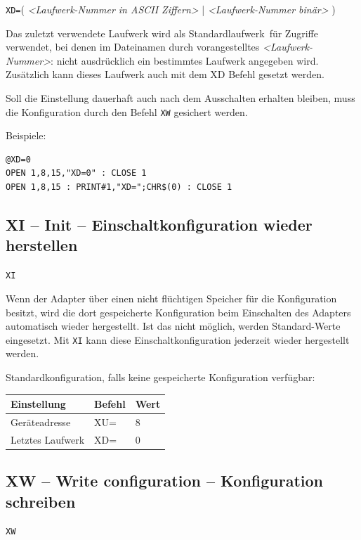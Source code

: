 \documentclass[10pt,a4paper]{scrartcl}		%
\begin{document}
\texttt{XD=}\Big( \textit{<Laufwerk-Nummer in ASCII Ziffern>} \Big|
\textit{<Laufwerk-Nummer binär>} \Big)

Das zuletzt verwendete Laufwerk wird als \glqq Standardlaufwerk\grqq\  für
Zugriffe verwendet, bei denen im Dateinamen durch vorangestelltes
\textit{<Laufwerk-Nummer>}: nicht ausdrücklich ein bestimmtes
Laufwerk angegeben wird.  
Zusätzlich kann dieses Laufwerk auch mit dem XD Befehl gesetzt werden.

Soll die Einstellung dauerhaft auch nach dem Ausschalten erhalten 
bleiben, muss die Konfiguration durch den Befehl \texttt{XW} gesichert werden.

Beispiele:

\begin{verbatim}
@XD=0
OPEN 1,8,15,"XD=0" : CLOSE 1
OPEN 1,8,15 : PRINT#1,"XD=";CHR$(0) : CLOSE 1
\end{verbatim}

\subsection{XI -- Init -- Einschaltkonfiguration wieder herstellen}

\texttt{XI}

Wenn der Adapter über einen nicht flüchtigen Speicher für die
Konfiguration besitzt, wird die dort gespeicherte Konfiguration beim
Einschalten des Adapters automatisch wieder hergestellt. 
Ist das nicht möglich, werden Standard-Werte eingesetzt.
Mit \texttt{XI} kann diese Einschaltkonfiguration jederzeit wieder
hergestellt werden.

Standardkonfiguration, falls keine gespeicherte Konfiguration verfügbar:

\begin{tabular}[c]{l l l}
\toprule 
Einstellung & Befehl & Wert\\
\midrule
Geräteadresse		& XU= & 8 \\
Letztes Laufwerk	& XD= & 0 \\
\bottomrule
\end{tabular}

\clearpage %
\subsection{XW -- Write configuration -- Konfiguration schreiben}

\texttt{XW}
\end{document}
